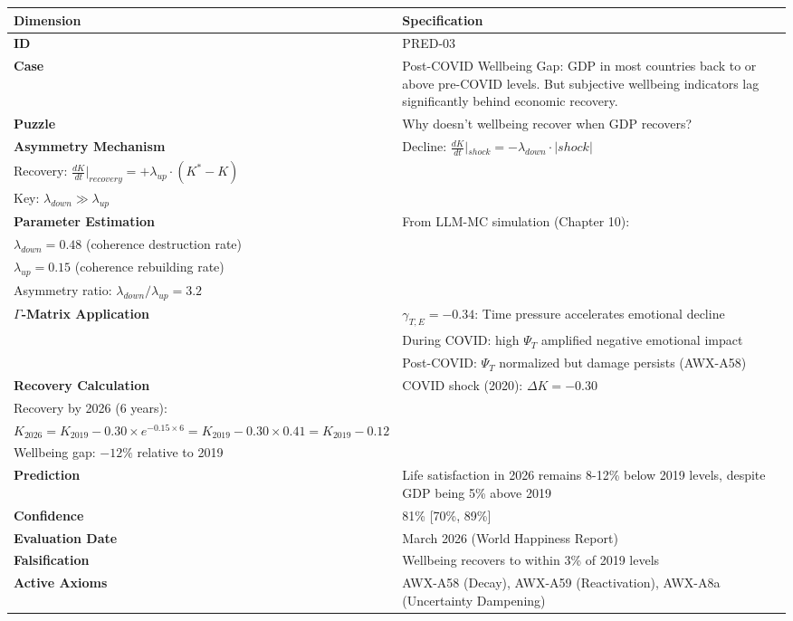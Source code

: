 \begin{table}[htbp]
\small
\begin{tabular}{p{3cm}p{11cm}}
\toprule
\textbf{Dimension} & \textbf{Specification} \\
\midrule
\textbf{ID} & PRED-03 \\
\textbf{Case} & Post-COVID Wellbeing Gap: GDP in most countries back to or above pre-COVID levels. But subjective wellbeing indicators lag significantly behind economic recovery. \\
\textbf{Puzzle} & Why doesn't wellbeing recover when GDP recovers? \\
\textbf{Asymmetry Mechanism} &
Decline: $\frac{dK}{dt}|_{shock} = -\lambda_{down} \cdot |shock|$ \\
Recovery: $\frac{dK}{dt}|_{recovery} = +\lambda_{up} \cdot (K^* - K)$ \\
Key: $\lambda_{down} \gg \lambda_{up}$ \\
\textbf{Parameter Estimation} &
From LLM-MC simulation (Chapter 10): \\
$\lambda_{down} = 0.48$ (coherence destruction rate) \\
$\lambda_{up} = 0.15$ (coherence rebuilding rate) \\
Asymmetry ratio: $\lambda_{down}/\lambda_{up} = 3.2$ \\
\textbf{$\Gamma$-Matrix Application} &
$\gamma_{T,E} = -0.34$: Time pressure accelerates emotional decline \\
& During COVID: high $\Psi_T$ amplified negative emotional impact \\
& Post-COVID: $\Psi_T$ normalized but damage persists (AWX-A58) \\
\textbf{Recovery Calculation} &
COVID shock (2020): $\Delta K = -0.30$ \\
Recovery by 2026 (6 years): \\
$K_{2026} = K_{2019} - 0.30 \times e^{-0.15 \times 6} = K_{2019} - 0.30 \times 0.41 = K_{2019} - 0.12$ \\
Wellbeing gap: $-12\%$ relative to 2019 \\
\textbf{Prediction} & Life satisfaction in 2026 remains 8-12\% below 2019 levels, despite GDP being 5\% above 2019 \\
\textbf{Confidence} & 81\% [70\%, 89\%] \\
\textbf{Evaluation Date} & March 2026 (World Happiness Report) \\
\textbf{Falsification} & Wellbeing recovers to within 3\% of 2019 levels \\
\textbf{Active Axioms} & AWX-A58 (Decay), AWX-A59 (Reactivation), AWX-A8a (Uncertainty Dampening) \\
\bottomrule
\end{tabular}
\end{table}

